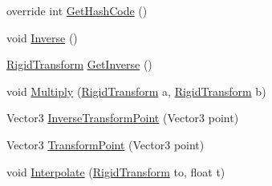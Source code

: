 \begin{DoxyCompactItemize}
\item 
override int \mbox{\hyperlink{struct_valve_1_1_v_r_1_1_steam_v_r___utils_1_1_rigid_transform_a8244c59a681ae8e0d5c5c04799e465d5}{Get\+Hash\+Code}} ()
\item 
void \mbox{\hyperlink{struct_valve_1_1_v_r_1_1_steam_v_r___utils_1_1_rigid_transform_a106ce58b5e6dfafcad9bd06582ed58f4}{Inverse}} ()
\item 
\mbox{\hyperlink{struct_valve_1_1_v_r_1_1_steam_v_r___utils_1_1_rigid_transform}{Rigid\+Transform}} \mbox{\hyperlink{struct_valve_1_1_v_r_1_1_steam_v_r___utils_1_1_rigid_transform_ae198207c3c7e330ecdd0316ce8433a36}{Get\+Inverse}} ()
\item 
void \mbox{\hyperlink{struct_valve_1_1_v_r_1_1_steam_v_r___utils_1_1_rigid_transform_a0f88b4b4ca8321ad9c2c1d0cc5f91a4e}{Multiply}} (\mbox{\hyperlink{struct_valve_1_1_v_r_1_1_steam_v_r___utils_1_1_rigid_transform}{Rigid\+Transform}} a, \mbox{\hyperlink{struct_valve_1_1_v_r_1_1_steam_v_r___utils_1_1_rigid_transform}{Rigid\+Transform}} b)
\item 
Vector3 \mbox{\hyperlink{struct_valve_1_1_v_r_1_1_steam_v_r___utils_1_1_rigid_transform_ae2edc8248d2ca9ca303e5b8157665b33}{Inverse\+Transform\+Point}} (Vector3 point)
\item 
Vector3 \mbox{\hyperlink{struct_valve_1_1_v_r_1_1_steam_v_r___utils_1_1_rigid_transform_a557949d44b1c3996dc3b1a74fbdd49dc}{Transform\+Point}} (Vector3 point)
\item 
void \mbox{\hyperlink{struct_valve_1_1_v_r_1_1_steam_v_r___utils_1_1_rigid_transform_ae46951071414d13e25a358d39481f2e1}{Interpolate}} (\mbox{\hyperlink{struct_valve_1_1_v_r_1_1_steam_v_r___utils_1_1_rigid_transform}{Rigid\+Transform}} to, float t)
\end{DoxyCompactItemize}
